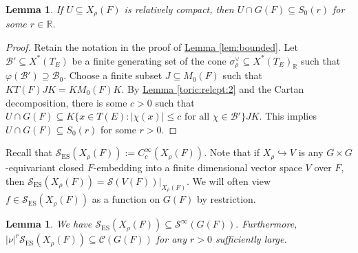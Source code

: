 \documentclass[10pt]{amsart}
\newtheorem{lemma}[theorem]{Lemma}
\theoremstyle{definition}
\numberwithin{equation}{section}
\numberwithin{equation}{subsection}
\newcommand{\RR}{\mathbb{R}}
\begin{document}
\begin{lemma}\label{lem:bounded:2} If $U\subseteq X_\rho(F)$ is relatively compact, then $U\cap G(F)\subseteq S_0(r)$ for some $r\in\RR$. 
\end{lemma}
\begin{proof} Retain the notation in the proof of \hyperref[lem:bounded]{Lemma \ref{lem:bounded}}. Let $\mathcal{B}'\subseteq X^*(T_E)$ be a finite generating set of the cone $\sigma_{\rho}^\vee\subseteq X^*(T_E)_\RR$ such that $\varphi(\mathcal{B}') \supseteq \mathcal{B}_0$. Choose a finite subset $J\subseteq M_0(F)$ such that $KT(F)JK=KM_0(F)K$. By \hyperref[toric:relcpt:2]{Lemma \ref{toric:relcpt:2}} and the Cartan decomposition, there is some $c>0$ such that $U\cap G(F)\subseteq K\{x\in T(E) : |\chi(x)|\leq c\text{ for all }\chi\in \mathcal{B}'\}JK$. This implies $U\cap G(F) \subseteq S_0(r)$ for some $r>0$.
\end{proof}

Recall that $\mathcal{S}_{\mathrm{ES}}(X_\rho(F)) := C_c^\infty(X_\rho(F))$. Note that if $X_\rho\hookrightarrow V$ is any $G\times G$-equivariant closed $F$-embedding into a finite dimensional vector space $V$ over $F$, then $\mathcal{S}_{\mathrm{ES}}(X_\rho(F))=\mathcal{S}(V(F))|_{X_\rho(F)}.$ We will often view $f\in \mathcal{S}_{\mathrm{ES}}(X_\rho(F))$ as a function on $G(F)$ by restriction.



\begin{lemma}\label{SESinSinfty}
    We have $\mathcal{S}_{\mathrm{ES}}(X_\rho(F))\subseteq \mathcal{S}^\infty(G(F)).$ Furthermore,  $|\nu|^r\mathcal{S}_{\mathrm{ES}}(X_\rho(F))\subseteq  \mathcal{C}(G(F))$ for any $r>0$ sufficiently large.
\end{lemma}
\end{document}
